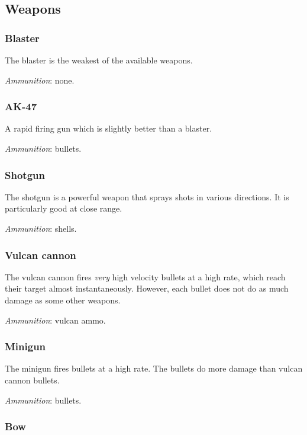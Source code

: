 \documentclass[a4paper,titlepage]{article}
\begin{document}
\subsection{Weapons}

\subsubsection*{Blaster}

The blaster is the weakest of the available weapons.

\noindent
\emph{Ammunition}: none.

\subsubsection*{AK-47}

A rapid firing gun which is slightly better than a blaster.

\noindent
\emph{Ammunition}: bullets.

\subsubsection*{Shotgun}

The shotgun is a powerful weapon that sprays shots in various
directions.  It is particularly good at close range.

\noindent
\emph{Ammunition}: shells.

\subsubsection*{Vulcan cannon}

The vulcan cannon fires \emph{very} high velocity bullets at a high
rate, which reach their target almost instantaneously.  However, each
bullet does not do as much damage as some other weapons.

\noindent
\emph{Ammunition}: vulcan ammo.

\subsubsection*{Minigun}

The minigun fires bullets at a high rate.  The bullets do more damage
than vulcan cannon bullets.

\noindent
\emph{Ammunition}: bullets.

\subsubsection*{Bow}
\end{document}
